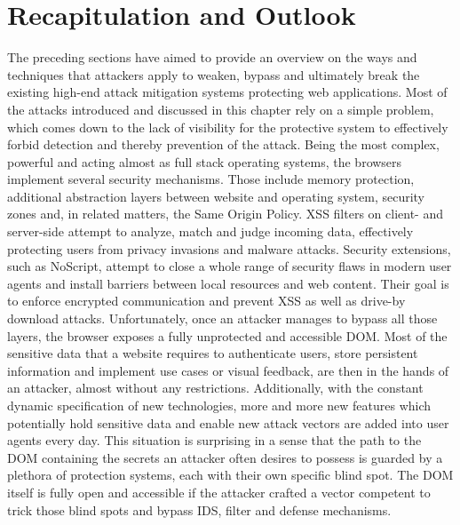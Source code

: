   \section{Recapitulation and Outlook}
  \label{subsec:5.7.recapitulation_and_outlook}

  The preceding sections have aimed to provide an overview on the ways and techniques that attackers apply to weaken, bypass and ultimately break the existing high-end attack mitigation systems protecting web applications. Most of the attacks introduced and discussed in this chapter rely on a simple problem, which comes down to the lack of visibility for the protective system to effectively forbid detection and thereby prevention of the attack. Being the most complex, powerful and acting almost as full stack operating systems, the browsers implement several security mechanisms. Those include memory protection, additional abstraction layers between website and operating system, security zones and, in related matters, the Same Origin Policy. XSS filters on client- and server-side attempt to analyze, match and judge incoming data, effectively protecting users from privacy invasions and malware attacks. Security extensions, such as NoScript, attempt to close a whole range of security flaws in modern user agents 
and install barriers between local resources and web content. Their goal is to enforce encrypted communication and prevent XSS as well as drive-by download attacks. Unfortunately, once an attacker manages to bypass all those layers, the browser exposes a fully unprotected and accessible DOM. Most of the sensitive data that a website requires to authenticate users, store persistent information and implement use cases or visual feedback, are then in the hands of an attacker, almost without any restrictions. Additionally, with the constant dynamic specification of new technologies, more and more new features which potentially hold sensitive data and enable new attack vectors are added into user agents every day. This situation is surprising in a sense that the path to the DOM containing the secrets an attacker often desires to possess is guarded by a plethora of protection systems, each with their own specific blind spot. The DOM itself is fully open and accessible if the attacker crafted a vector competent to 
trick those blind spots and bypass IDS, filter and defense mechanisms.\\

